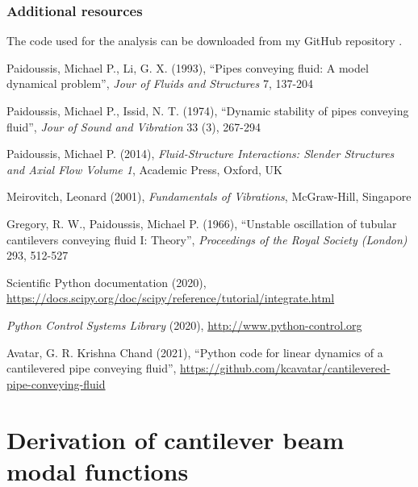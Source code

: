 \documentclass[12pt]{report}
\begin{document}
\subsection*{Additional resources}
The code used for the analysis can be downloaded from my GitHub repository \cite{my-github}.

%

\begin{thebibliography}{99}
	Paidoussis, Michael P., Li, G. X. (1993), ``Pipes conveying fluid: A model dynamical problem'', \textit{Jour of Fluids and Structures} 7, 137-204
	
	Paidoussis, Michael P., Issid, N. T. (1974), ``Dynamic stability of pipes conveying fluid'', \textit{Jour of Sound and Vibration} 33 (3), 267-294
	
	Paidoussis, Michael P. (2014), \textit{Fluid-Structure Interactions: Slender Structures and Axial Flow Volume 1}, Academic Press, Oxford, UK
	
	Meirovitch, Leonard (2001), \textit{Fundamentals of Vibrations}, McGraw-Hill, Singapore
	
	Gregory, R. W., Paidoussis, Michael P. (1966), ``Unstable oscillation of tubular cantilevers conveying fluid I: Theory'', \textit{Proceedings of the Royal Society (London)} 293, 512-527
	
	Scientific Python documentation (2020), \url{https://docs.scipy.org/doc/scipy/reference/tutorial/integrate.html}
	
	\textit{Python Control Systems Library} (2020), \url{http://www.python-control.org}
	
	Avatar, G. R. Krishna Chand (2021), ``Python code for linear dynamics of a cantilevered pipe conveying fluid'', \url{https://github.com/kcavatar/cantilevered-pipe-conveying-fluid}
	
\end{thebibliography}

\appendixpage

\appendix

\chapter{Derivation of cantilever beam modal functions}\label{app:cantilever-beam-modes}
\end{document}
